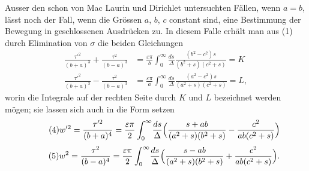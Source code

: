 \documentclass[12pt,a4paper]{book}
\theoremstyle{definition}
\theoremstyle{remark}
\begin{document}
Ausser den schon von Mac Laurin und Dirichlet untersuchten Fällen, wenn $a = b$, lässt noch der Fall, wenn die Grössen $a$, $b$, $c$ constant sind, eine Bestimmung der Bewegung in geschlossenen Ausdrücken zu. In diesem Falle erhält man aus (1) durch Elimination von $\sigma$ die beiden Gleichungen
\begin{equation}
\tag{3}
\begin{aligned}
\frac{\tau'^2}{(b+a)^3} + \frac{\tau^2}{(b-a)^3} &= \frac{\varepsilon\pi}{b}\int_0^{\infty}\!\frac{ds}{\Delta}\frac{(b^2-c^2)s}{(b^2+s)(c^2+s)} = K\\
\frac{\tau'^2}{(b+a)^3} - \frac{\tau^2}{(b-a)^3} &= \frac{\varepsilon\pi}{a}\int_0^{\infty}\!\frac{ds}{\Delta}\frac{(a^2-c^2)s}{(a^2+s)(c^2+s)} = L,
\end{aligned}
\end{equation}
worin die Integrale auf der rechten Seite durch $K$ und $L$ bezeichnet werden mögen; sie lassen sich auch in die Form setzen
\begin{equation}
\tag{4} w'^2 = \frac{\tau'^2}{(b+a)^4} = \frac{\varepsilon\pi}{2}\int_0^{\infty}\!\frac{ds}{\Delta}\Bigl(\frac{s+ab}{(a^2+s)(b^2+s)} - \frac{c^2}{ab(c^2+s)}\Bigr) \end{equation}
\begin{equation}
\tag{5} w^2 = \frac{\tau^2}{(b-a)^4} = \frac{\varepsilon\pi}{2}\int_0^{\infty}\!\frac{ds}{\Delta}\Bigl(\frac{s-ab}{(a^2+s)(b^2+s)} + \frac{c^2}{ab(c^2+s)}\Bigr). \end{equation}
\end{document}
